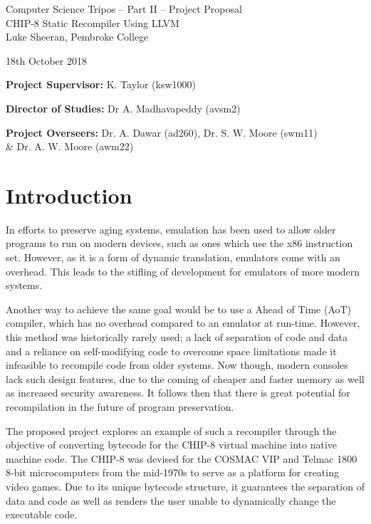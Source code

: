 \documentclass[12pt,a4paper,twoside]{article}
\begin{document}
\begin{center}
\Large
Computer Science Tripos -- Part II -- Project Proposal\\[4mm]
\LARGE
CHIP-8 Static Recompiler Using LLVM\\[4mm]

\large
Luke Sheeran, Pembroke College

18th October 2018
\end{center}

\vspace{5mm}

\textbf{Project Supervisor:} K. Taylor (ksw1000)

\textbf{Director of Studies:} Dr A. Madhavapeddy (avsm2)

\textbf{Project Overseers:} Dr. A. Dawar (ad260), Dr. S. W. Moore (swm11) \\\& Dr. A. W. Moore (awm22)


\section*{Introduction}

In efforts to preserve aging systems, emulation has been used to allow older programs to run on modern devices, such as ones which use the x86 instruction set. However, as it is a form of dynamic translation, emulators come with an overhead. This leads to the stifling of development for emulators of more modern systems.

Another way to achieve the same goal would be to use a Ahead of Time (AoT) compiler, which has no overhead compared to an emulator at run-time. However, this method was historically rarely used; a lack of separation of code and data and a reliance on self-modifying code to overcome space limitations made it infeasible to recompile code from older systems. Now though, modern consoles lack such design features, due to the coming of cheaper and faster memory as well as increased security awareness. It follows then that there is great potential for recompilation in the future of program preservation.

The proposed project explores an example of such a recompiler through the objective of converting bytecode for the CHIP-8 virtual machine into native machine code. The CHIP-8 was devised for the COSMAC VIP and Telmac 1800 8-bit microcomputers from the mid-1970s to serve as a platform for creating video games. Due to its unique bytecode structure, it guarantees the separation of data and code as well as renders the user unable to dynamically change the executable code.
\end{document}

